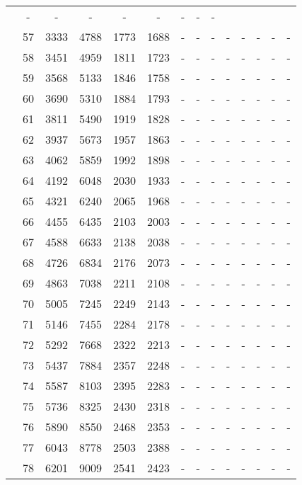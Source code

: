 \begin{table}[htb]
{\begin{tabular}{|c|c|c|c|c|c|c|c|c|c|c|c|c|c|}
 & - & -
 & - & -
 & - & -
 & - & -
 \\
 & 
57 & 3333 & 4788 & 1773 & 1688
 & - & -
 & - & -
 & - & -
 & - & -
 \\
 & 
58 & 3451 & 4959 & 1811 & 1723
 & - & -
 & - & -
 & - & -
 & - & -
 \\
 & 
59 & 3568 & 5133 & 1846 & 1758
 & - & -
 & - & -
 & - & -
 & - & -
 \\
 & 
60 & 3690 & 5310 & 1884 & 1793
 & - & -
 & - & -
 & - & -
 & - & -
 \\
 & 
61 & 3811 & 5490 & 1919 & 1828
 & - & -
 & - & -
 & - & -
 & - & -
 \\
 & 
62 & 3937 & 5673 & 1957 & 1863
 & - & -
 & - & -
 & - & -
 & - & -
 \\
 & 
63 & 4062 & 5859 & 1992 & 1898
 & - & -
 & - & -
 & - & -
 & - & -
 \\
 & 
64 & 4192 & 6048 & 2030 & 1933
 & - & -
 & - & -
 & - & -
 & - & -
 \\
 & 
65 & 4321 & 6240 & 2065 & 1968
 & - & -
 & - & -
 & - & -
 & - & -
 \\
 & 
66 & 4455 & 6435 & 2103 & 2003
 & - & -
 & - & -
 & - & -
 & - & -
 \\
 & 
67 & 4588 & 6633 & 2138 & 2038
 & - & -
 & - & -
 & - & -
 & - & -
 \\
 & 
68 & 4726 & 6834 & 2176 & 2073
 & - & -
 & - & -
 & - & -
 & - & -
 \\
 & 
69 & 4863 & 7038 & 2211 & 2108
 & - & -
 & - & -
 & - & -
 & - & -
 \\
 & 
70 & 5005 & 7245 & 2249 & 2143
 & - & -
 & - & -
 & - & -
 & - & -
 \\
 & 
71 & 5146 & 7455 & 2284 & 2178
 & - & -
 & - & -
 & - & -
 & - & -
 \\
 & 
72 & 5292 & 7668 & 2322 & 2213
 & - & -
 & - & -
 & - & -
 & - & -
 \\
 & 
73 & 5437 & 7884 & 2357 & 2248
 & - & -
 & - & -
 & - & -
 & - & -
 \\
 & 
74 & 5587 & 8103 & 2395 & 2283
 & - & -
 & - & -
 & - & -
 & - & -
 \\
 & 
75 & 5736 & 8325 & 2430 & 2318
 & - & -
 & - & -
 & - & -
 & - & -
 \\
 & 
76 & 5890 & 8550 & 2468 & 2353
 & - & -
 & - & -
 & - & -
 & - & -
 \\
 & 
77 & 6043 & 8778 & 2503 & 2388
 & - & -
 & - & -
 & - & -
 & - & -
 \\
 & 
78 & 6201 & 9009 & 2541 & 2423
 & - & -
 & - & -
 & - & -
 & - & -
 \\

\end{tabular}}
\end{table}
